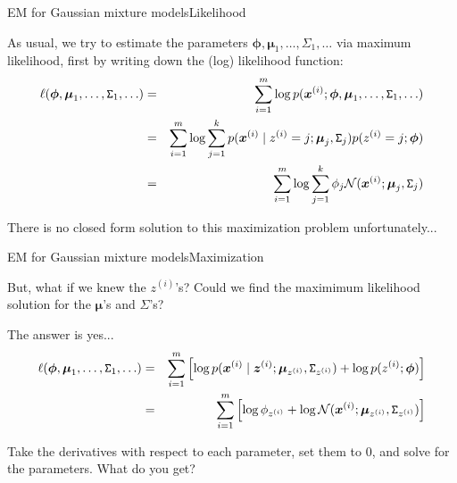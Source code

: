 \documentclass{beamer}
\renewcommand{\vec}[1]{\boldsymbol{#1}}
\newcommand{\mat}[1]{\mathtt{#1}}
\begin{document}
\begin{frame}{EM for Gaussian mixture models}{Likelihood}

  As usual, we try to estimate the parameters
  $\vec{\phi},\vec{\mu}_1,\ldots,\mat{\Sigma}_1,\ldots$ via maximum
  likelihood, first by writing down the (log) likelihood function:
  \begin{eqnarray*}
    \ell(\vec{\phi},\vec{\mu}_1,\ldots,\mat{\Sigma}_1,\ldots)
     & = & \sum_{i=1}^m \log p(\vec{x}^{(i)}; \vec{\phi},\vec{\mu}_1,\ldots,\mat{\Sigma}_1,\ldots) \\
    & = & \sum_{i=1}^m \log \sum_{j=1}^k p(\vec{x}^{(i)} \mid z^{(i)}=j ;
    \vec{\mu}_j,\mat{\Sigma}_j)p(z^{(i)}=j ; \vec{\phi}) \\
    & = & \sum_{i=1}^m \log \sum_{j=1}^k \phi_j {\cal N}(\vec{x}^{(i)} ; \vec{\mu}_j,
    \mat{\Sigma}_j)
  \end{eqnarray*}

  There is no closed form solution to this maximization
  problem unfortunately...

\end{frame}


\begin{frame}{EM for Gaussian mixture models}{Maximization}

  But, what if we knew the $z^{(i)}$'s? Could we find the maximimum
  likelihood solution for the $\vec{\mu}$'s and $\Sigma$'s?

  \medskip

  The answer is yes...
  \begin{eqnarray*}
  \ell(\vec{\phi},\vec{\mu}_1,\ldots,\mat{\Sigma}_1,\ldots)
  & = & \sum_{i=1}^m \left[ \log p(\vec{x}^{(i)} \mid \vec{z}^{(i)} ; \vec{\mu}_{z^{(i)}},\mat{\Sigma}_{z^{(i)}}) + \log p(z^{(i)} ; \vec{\phi}) \right] \\
  & = & \sum_{i=1}^m \left[ \log \phi_{z^{(i)}} + \log {\cal N}(\vec{x}^{(i)} ; \vec{\mu}_{z^{(i)}},\mat{\Sigma}_{z^{(i)}}) \right]
  \end{eqnarray*}

  Take the derivatives with respect to each parameter, set them to 0,
  and solve for the parameters. What do you get?
  
\end{frame}
\end{document}
